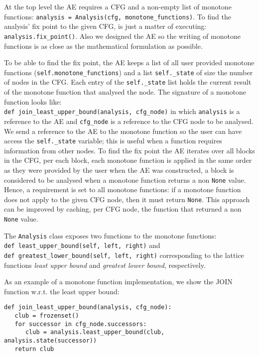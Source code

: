 At the top level the AE requires a CFG and a non-empty list of monotone functions: \lstinline{analysis = Analysis(cfg, monotone_functions)}. To find the analysis' fix point to the given CFG, is just a matter of executing: \lstinline{analysis.fix_point()}. Also we designed the AE so the writing of monotone functions is as close as the mathematical formulation as possible.

To be able to find the fix point, the AE keeps a list of all user provided monotone functions (\lstinline{self.monotone_functions}) and a list \lstinline{self._state} of size the number of nodes in the CFG. Each entry of the \lstinline{self._state} list holds the current result of the monotone function that analysed the node. The signature of a monotone function looks like: \\\lstinline{def join_least_upper_bound(analysis, cfg_node)} in which \lstinline{analysis} is a reference to the AE and \lstinline{cfg_node} is a reference to the CFG node to be analysed. We send a reference to the AE to the monotone function so the user can have access the
\lstinline{self._state} variable; this is useful when a function requires information from other nodes.
To find the fix point the AE iterates over all blocks in the CFG, per each block, each monotone function is applied in the same order as they were provided by the user when the AE was constructed, a block is considered to be analysed when a monotone function returns a non \lstinline{None} value. Hence, a requirement is set to all monotone functions: if a monotone function does not apply to the given CFG node, then it must return \lstinline{None}. This approach can be improved by caching, per CFG node, the function that returned a non \lstinline{None} value.

The \lstinline{Analysis} class exposes two functions to the monotone functions: \\\lstinline{def least_upper_bound(self, left, right)} and \\\lstinline{def greatest_lower_bound(self, left, right)} corresponding to the lattice functions \emph{least upper bound} and \emph{greatest lower bound}, respectively.

As an example of a monotone function implementation, we show the JOIN function w.r.t. the least upper bound: 
\begin{verbatim}
def join_least_upper_bound(analysis, cfg_node):
   club = frozenset()
   for successor in cfg_node.successors:
      club = analysis.least_upper_bound(club, analysis.state(successor))
   return club
\end{verbatim}

